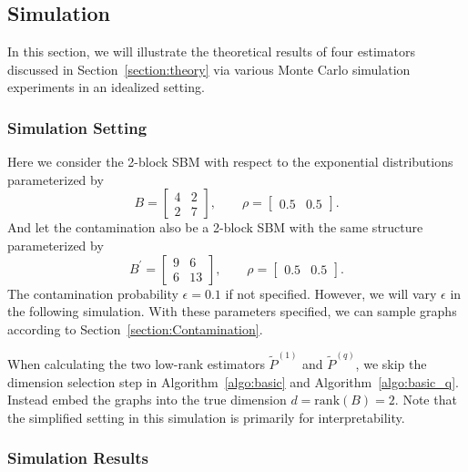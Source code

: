 \documentclass[a4paper]{article}
\begin{document}
\subsection{Simulation}
\label{section:sim}

In this section, we will illustrate the theoretical results of four estimators discussed in Section~\ref{section:theory} via various Monte Carlo simulation experiments in an idealized setting.

\subsubsection{Simulation Setting}
\label{section:sim_setting}
Here we consider the 2-block SBM with respect to the exponential distributions parameterized by
\begin{equation*}
B = \begin{bmatrix}
4 & 2 \\
2 & 7
\end{bmatrix}
,\qquad \rho = \begin{bmatrix}
0.5 & 0.5
\end{bmatrix}.
\end{equation*}
And let the contamination also be a 2-block SBM with the same structure parameterized by
\begin{equation*}
B^{\prime} = \begin{bmatrix}
9 & 6 \\
6 & 13
\end{bmatrix}
,\qquad \rho = \begin{bmatrix}
0.5 & 0.5
\end{bmatrix}.
\end{equation*}
The contamination probability $\epsilon = 0.1$ if not specified. However, we will vary $\epsilon$ in the following simulation. With these parameters specified, we can sample graphs according to Section~\ref{section:Contamination}.

When calculating the two low-rank estimators $\widetilde{P}^{(1)}$ and $\widetilde{P}^{(q)}$, we skip the dimension selection step in Algorithm~\ref{algo:basic} and Algorithm~\ref{algo:basic_q}. Instead embed the graphs into the true dimension $d = \mathrm{rank}(B) = 2$.
Note that the simplified setting in this simulation is primarily for interpretability.



\subsubsection{Simulation Results}
\end{document}
